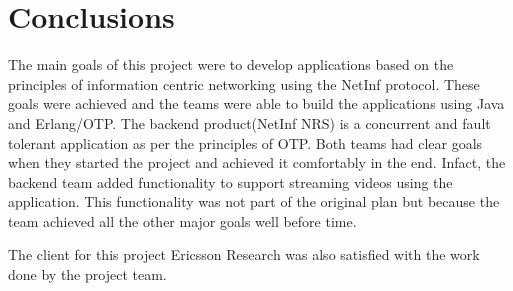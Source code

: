 \section{Conclusions}
The main goals of this project were to develop applications based on the principles of information centric networking using the NetInf protocol. These goals were achieved and the teams were able to build the applications using Java and Erlang/OTP. The backend product(NetInf NRS) is a concurrent and fault tolerant application as per the principles of OTP. Both teams had clear goals when they started the project and achieved it comfortably in the end. Infact, the backend team added functionality to support streaming videos using the application. This functionality was not part of the original plan but because the team achieved all the other major goals well before time.

The client for this project Ericsson Research was also satisfied with the work done by the project team. 
